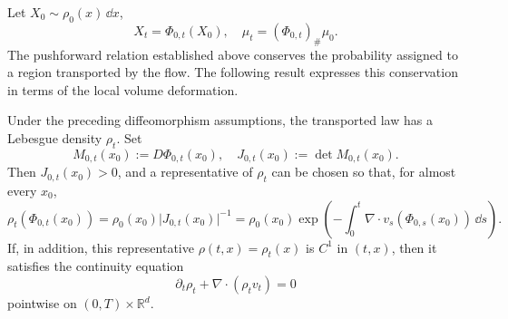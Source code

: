 \documentclass[12pt,a4paper,oneside]{book}
\begin{document}
Let $X_0\sim\rho_0(x)\,\dd x$, 
\begin{equation*}
    X_t=\Phi_{0,t}(X_0), \quad \mu_t=(\Phi_{0,t})_\#\mu_0.
\end{equation*}
The pushforward relation established above conserves the probability assigned to a region transported by the flow. The 
following result expresses this conservation in terms of the local volume deformation.

\begin{proposition}
\label{prop:changevar}\label{thm:continuity}
\label{src:p9q7}\label{src:p9q8}

Under the preceding diffeomorphism assumptions, the transported law has a Lebesgue density $\rho_t$. Set
\begin{equation*}
    M_{0,t}(x_0):=D\Phi_{0,t}(x_0), \quad J_{0,t}(x_0):=\det M_{0,t}(x_0).
\end{equation*}
Then $J_{0,t}(x_0)>0$, and a representative of $\rho_t$ can be chosen so that, for almost every $x_0$,
\begin{equation*}
    \rho_t(\Phi_{0,t}(x_0)) = \rho_0(x_0)\big|J_{0,t}(x_0)\big|^{-1} = \rho_0(x_0)\exp
        \left(
            -\int_0^t\nabla\cdot v_s(\Phi_{0,s}(x_0))\,\dd s
        \right).
\end{equation*}
If, in addition, this representative $\rho(t,x)=\rho_t(x)$ is $C^1$ in $(t,x)$, then it satisfies the continuity equation
\begin{equation}
    \partial_t\rho_t+\nabla\cdot(\rho_tv_t)=0
    \label{eq:continuity}
\end{equation}
pointwise on $(0,T)\times\mathbb R^d$.
\end{proposition}
\end{document}
